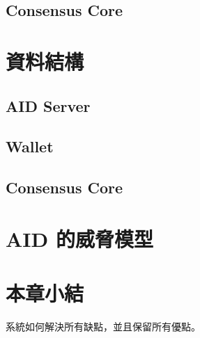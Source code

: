\subsection{Consensus Core}
\section{資料結構}
\subsection{AID Server}
\subsection{Wallet}
\subsection{Consensus Core}
\section{AID 的威脅模型}
\section{本章小結}
系統如何解決所有缺點，並且保留所有優點。